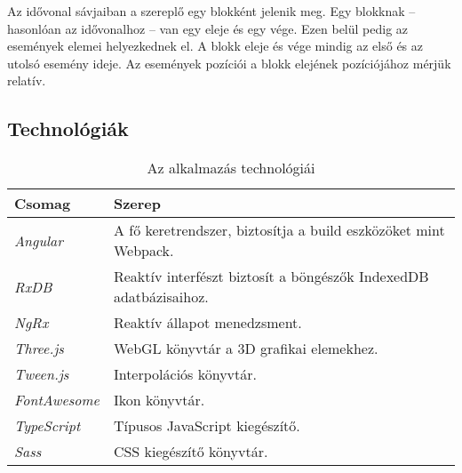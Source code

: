 Az idővonal sávjaiban a szereplő egy blokként jelenik meg. Egy blokknak -- hasonlóan az idővonalhoz -- van egy eleje és egy vége. Ezen belül pedig az események elemei helyezkednek el. A blokk eleje és vége mindig az első és az utolsó esemény ideje. Az események pozíciói a blokk elejének pozíciójához mérjük relatív.











































\subsection{Technológiák}

\begin{table}[H]
	\centering
	\begin{tabular}{ | m{} | m{} | }
		\hline
		\textbf{Csomag} & \textbf{Szerep} \\
		\hline \hline
		\emph{Angular} \cite{Angular} & A fő keretrendszer, biztosítja a build eszközöket mint Webpack. \\
		\hline
		\emph{RxDB} \cite{RxDB} & Reaktív interfészt biztosít a böngészők IndexedDB adatbázisaihoz. \\
		\hline
		\emph{NgRx} \cite{NgRx} & Reaktív állapot menedzsment. \\
		\hline
		\emph{Three.js} \cite{Three} & WebGL könyvtár a 3D grafikai elemekhez. \\
		\hline
		\emph{Tween.js} \cite{Tween} & Interpolációs könyvtár. \\
		\hline
		\emph{FontAwesome} \cite{FontAwesome} & Ikon könyvtár.  \\
		\hline
		\emph{TypeScript} \cite{TypeScript} & Típusos JavaScript kiegészítő.  \\
		\hline

		\emph{Sass} \cite{Sass} & CSS kiegészítő könyvtár.  \\
		\hline
	\end{tabular}
	\caption{Az alkalmazás technológiái}
	\label{tab:technologies}
\end{table}

